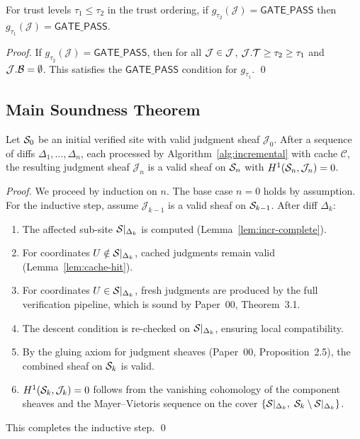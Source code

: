 \documentclass[11pt]{article}
\newcommand{\GatePass}{\mathsf{GATE\_PASS}}
\begin{document}
\begin{lemma}\label{lem:gate-mono}
For trust levels $\tau_1 \leq \tau_2$ in the trust ordering, if
$g_{\tau_2}(\mathcal{J}) = \GatePass$ then
$g_{\tau_1}(\mathcal{J}) = \GatePass$.
\end{lemma}

\begin{proof}
If $g_{\tau_2}(\mathcal{J}) = \GatePass$, then for all $\mathcal{J} \in \mathcal{J}$,
$\mathcal{J}.\mathcal{T} \geq \tau_2 \geq \tau_1$ and $\mathcal{J}.\mathcal{B} = \emptyset$. This
satisfies the $\GatePass$ condition for $g_{\tau_1}$. \qed
\end{proof}

\subsection{Main Soundness Theorem}

\begin{theorem}\label{thm:pipeline-sound}
Let $\mathcal{S}_0$ be an initial verified site with valid judgment sheaf
$\mathcal{J}_0$. After a sequence of diffs $\Delta_1, \ldots, \Delta_n$,
each processed by Algorithm~\ref{alg:incremental} with cache $\mathcal{C}$,
the resulting judgment sheaf $\mathcal{J}_n$ is a valid sheaf on $\mathcal{S}_n$
with $H^{1}(\mathcal{S}_n, \mathcal{J}_n) = 0$.
\end{theorem}

\begin{proof}
We proceed by induction on $n$. The base case $n = 0$ holds by assumption.
For the inductive step, assume $\mathcal{J}_{k-1}$ is a valid sheaf on
$\mathcal{S}_{k-1}$. After diff $\Delta_k$:
\begin{enumerate}
  \item The affected sub-site $\mathcal{S}|_{\Delta_k}$ is computed
        (Lemma~\ref{lem:incr-complete}).
  \item For coordinates $U \notin \mathcal{S}|_{\Delta_k}$, cached judgments remain
        valid (Lemma~\ref{lem:cache-hit}).
  \item For coordinates $U \in \mathcal{S}|_{\Delta_k}$, fresh judgments are produced
        by the full verification pipeline, which is sound by Paper~00,
        Theorem~3.1.
  \item The descent condition is re-checked on $\mathcal{S}|_{\Delta_k}$, ensuring
        local compatibility.
  \item By the gluing axiom for judgment sheaves (Paper~00, Proposition~2.5),
        the combined sheaf on $\mathcal{S}_k$ is valid.
  \item $H^{1}(\mathcal{S}_k, \mathcal{J}_k) = 0$ follows from the vanishing
        cohomology of the component sheaves and the Mayer--Vietoris sequence
        on the cover
        $\{\mathcal{S}|_{\Delta_k},\; \mathcal{S}_k \setminus \mathcal{S}|_{\Delta_k}\}$.
\end{enumerate}
This completes the inductive step. \qed
\end{proof}
\end{document}

